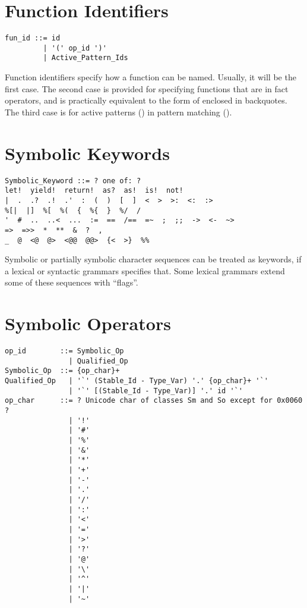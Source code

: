 \section{Function Identifiers}
\label{sec:function-identifiers}

\syntax\begin{lstlisting}
fun_id ::= id
         | '(' op_id ')'
         | Active_Pattern_Ids
\end{lstlisting}

Function identifiers specify how a function can be named. Usually, it will be the first case. The second case is provided for specifying functions that are in fact operators, and is practically equivalent to the form of  enclosed in backquotes. The third case is for active patterns () in pattern matching (). 





\section{Symbolic Keywords}
\label{sec:symbolic-keywords}

\syntax\begin{lstlisting}[deletekeywords={of}]
Symbolic_Keyword ::= ? one of: ?
let!  yield!  return!  as?  as!  is!  not!
|  .  .?  .!  .'  :  (  )  [  ]  <  >  >:  <:  :>
%[|  |]  %[  %(  {  %{  }  %/  /
'  #  ..  ..<  ...  :=  ==  /==  =~  ;  ;;  ->  <-  ~>
=>  =>>  *  **  &  ?  ,
_  @  <@  @>  <@@  @@>  {<  >}  %%
\end{lstlisting}

Symbolic or partially symbolic character sequences can be treated as keywords, if a lexical or syntactic grammars specifies that. Some lexical grammars extend some of these sequences with ``flags''. 





\section{Symbolic Operators}
\label{sec:symbolic-operators}

\syntax\begin{lstlisting}[deletekeywords={of,and,for}]
op_id        ::= Symbolic_Op
               | Qualified_Op
Symbolic_Op  ::= {op_char}+
Qualified_Op   | '`' (Stable_Id - Type_Var) '.' {op_char}+ '`'
               | '`' [(Stable_Id - Type_Var)] '.' id '`'
op_char      ::= ? Unicode char of classes Sm and So except for 0x0060 ?
               | '!'
               | '#'
               | '%'
               | '&'
               | '*'
               | '+'
               | '-'
               | '.'
               | '/'
               | ':'
               | '<'
               | '='
               | '>'
               | '?'
               | '@'
               | '\'
               | '^'
               | '|'
               | '~'
\end{lstlisting}

